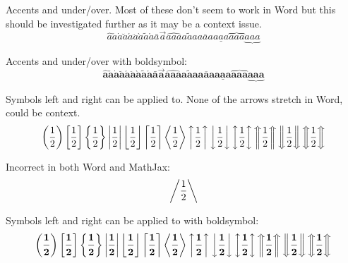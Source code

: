 \documentclass[12pt,a4paper]{article}
\theoremstyle{clearprint}
\begin{document}
\noindent 
Accents and under/over. Most of these don't seem to work in Word but this should be investigated further as it may be a context issue. 
\begin{equation}
\hat{a} \check{a} \dot{a} \breve{a} \acute{a} \ddot{a} \grave{a} \tilde{a} \mathring{a} \bar{a} \vec{a} \widehat{aaa} \widetilde{aaa} \overline{aaa} \underline{aaa} \overbrace{aaa} \underbrace{aaa}
\end{equation}

\noindent 
Accents and under/over with boldsymbol:
\begin{equation}
\boldsymbol{\hat{a} \check{a} \dot{a} \breve{a} \acute{a} \ddot{a} \grave{a} \tilde{a} \mathring{a} \bar{a} \vec{a} \widehat{aaa} \widetilde{aaa} \overline{aaa} \underline{aaa} \overbrace{aaa} \underbrace{aaa}}
\end{equation}

\noindent 
Symbols left and right can be applied to. None of the arrows stretch in Word, could be context. 
\begin{equation}
\left( \frac{1}{2} \right) \left[ \frac{1}{2} \right] \left\{ \frac{1}{2} \right\} \left| \frac{1}{2} \right| \left\lfloor \frac{1}{2} \right\rfloor \left\lceil \frac{1}{2} \right\rceil \left\langle \frac{1}{2} \right\rangle \left\uparrow \frac{1}{2} \right\uparrow \left\downarrow \frac{1}{2} \right\downarrow \left\updownarrow \frac{1}{2} \right\updownarrow \left\Uparrow \frac{1}{2} \right\Uparrow \left\Downarrow \frac{1}{2} \right\Downarrow \left\Updownarrow \frac{1}{2} \right\Updownarrow   
\end{equation}

Incorrect in both Word and MathJax:
\begin{equation}
\left/ \frac{1}{2} \right\backslash 
\end{equation}

\noindent 
Symbols left and right can be applied to with boldsymbol:
\begin{equation}
\boldsymbol{\left( \frac{1}{2} \right) \left[ \frac{1}{2} \right] \left\{ \frac{1}{2} \right\} \left| \frac{1}{2} \right| \left\lfloor \frac{1}{2} \right\rfloor \left\lceil \frac{1}{2} \right\rceil \left\langle \frac{1}{2} \right\rangle \left\uparrow \frac{1}{2} \right\uparrow \left\downarrow \frac{1}{2} \right\downarrow \left\updownarrow \frac{1}{2} \right\updownarrow \left\Uparrow \frac{1}{2} \right\Uparrow \left\Downarrow \frac{1}{2} \right\Downarrow \left\Updownarrow \frac{1}{2} \right\Updownarrow }  
\end{equation}
\end{document}
